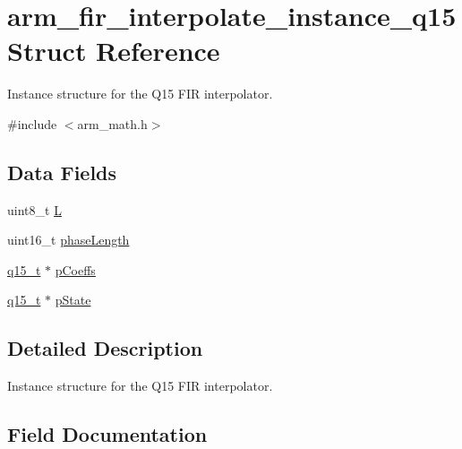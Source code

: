 \hypertarget{structarm__fir__interpolate__instance__q15}{}\section{arm\+\_\+fir\+\_\+interpolate\+\_\+instance\+\_\+q15 Struct Reference}
\label{structarm__fir__interpolate__instance__q15}


Instance structure for the Q15 F\+IR interpolator.  




{\ttfamily \#include $<$arm\+\_\+math.\+h$>$}

\subsection*{Data Fields}
\begin{DoxyCompactItemize}
\item 
uint8\+\_\+t \mbox{\hyperlink{structarm__fir__interpolate__instance__q15_aee73cc056696e504430c53eaa9c58cf0}{L}}
\item 
uint16\+\_\+t \mbox{\hyperlink{structarm__fir__interpolate__instance__q15_a8f92bb07e0812f94679438cdf412b26a}{phase\+Length}}
\item 
\mbox{\hyperlink{arm__math_8h_ab5a8fb21a5b3b983d5f54f31614052ea}{q15\+\_\+t}} $\ast$ \mbox{\hyperlink{structarm__fir__interpolate__instance__q15_a7ca181a37f714d174445f486bebce26f}{p\+Coeffs}}
\item 
\mbox{\hyperlink{arm__math_8h_ab5a8fb21a5b3b983d5f54f31614052ea}{q15\+\_\+t}} $\ast$ \mbox{\hyperlink{structarm__fir__interpolate__instance__q15_ae29dfdb736374fcddaeaec4b7770170c}{p\+State}}
\end{DoxyCompactItemize}


\subsection{Detailed Description}
Instance structure for the Q15 F\+IR interpolator. 

\subsection{Field Documentation}
\mbox{\label{structarm__fir__interpolate__instance__q15_aee73cc056696e504430c53eaa9c58cf0}} 
